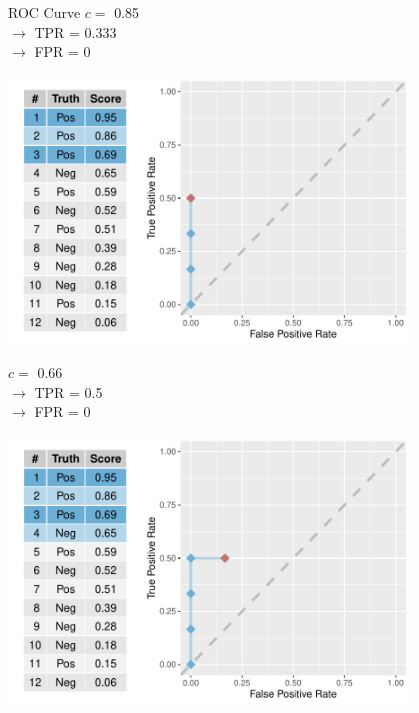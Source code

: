 \documentclass[11pt,compress,t,notes=noshow, xcolor=table]{beamer}
\newenvironment{knitrout}{}{} %
\begin{document}
\begin{vbframe}{ROC Curve}
$c =$ 0.85\\
$\rightarrow$ TPR = 0.333 \\
$\rightarrow$ FPR = 0

\framebreak

\begin{knitrout}\scriptsize
{}\color{fgcolor}

{\centering \includegraphics[width=0.8\textwidth]{figure/eval_mclass_roc_sp_7}

}



\end{knitrout}

$c =$ 0.66\\
$\rightarrow$ TPR = 0.5 \\
$\rightarrow$ FPR = 0

\framebreak

\begin{knitrout}\scriptsize
{}\color{fgcolor}

{\centering \includegraphics[width=0.8\textwidth]{figure/eval_mclass_roc_sp_8}

}
\end{knitrout}
\end{vbframe}
\end{document}
